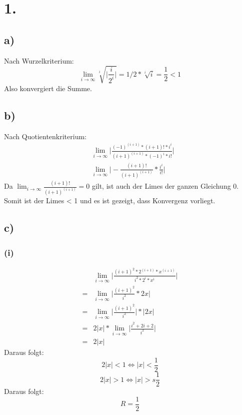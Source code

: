 \documentclass[a4paper]{scrartcl}
\title{\titleinfo}
\author{Elena Noll, Sven-Hendrik Haase, Arne Struck}
\date{\today}
\begin{document}
\maketitle
\notag

\section{1.}
\subsection{a)}
Nach Wurzelkriterium:
\[ \lim_{i\to\infty} \sqrt[i]{\bigg| \frac{i}{2^i} \bigg|} = 1/2 * \sqrt[i]{i} = \frac{1} {2} < 1 \]
Also konvergiert die Summe.

\subsection{b)}
Nach Quotientenkriterium:
\begin{align}
&\lim_{i\to\infty} \bigg| \frac{(-1)^{(i+1)} * (i+1)! * i^i} {(i+1)^{(i+1)} * (-1)^i * i!} \bigg| \\
&\lim_{i\to\infty} \bigg| - \frac{(i+1)!} {(i+1)^{(i+1)}} * \frac{i^i} {i!} \bigg|
\end{align}
Da \(\lim_{i\to\infty} \frac{(i+1)!} {(i+1)^{(i+1)}} = 0\) gilt, ist auch der Limes der ganzen Gleichung 0. \\
Somit ist der Limes < 1 und es ist gezeigt, dass Konvergenz vorliegt. 

\subsection{c)}
\subsubsection{(i)}
\begin{align}
  &\lim_{i\to\infty} \bigg| \frac{(i+1)^2 * 2^{(i+1)} * x^{(i+1)}} {i^2 * 2^i * x^i} \bigg| \\
= &\lim_{i\to\infty} \bigg| \frac{(i+1)^2} {i^2} * 2x \bigg| \\
= &\lim_{i\to\infty} \bigg| \frac{(i+1)^2} {i^2} \bigg| * |2x| \\
= & 2|x| * \lim_{i\to\infty} \bigg| \frac{i^2 + 2i + 2} {i^2} \bigg| \\
= & 2|x|
\end{align}
Daraus folgt: 
\[2|x| < 1 \Leftrightarrow |x| < \frac{1}{2}\]
\[2|x| > 1 \Leftrightarrow |x| >s \frac{1}{2}\]
Daraus folgt: \\
\[R = \frac{1}{2}\]
\end{document}
